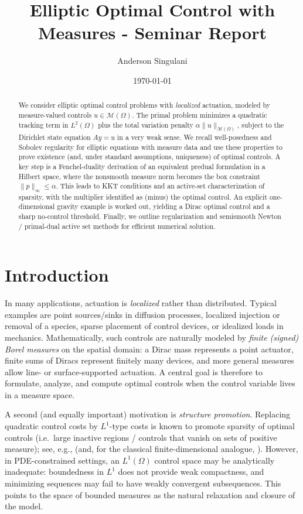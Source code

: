 \documentclass[11pt,a4paper]{article}
\title{Elliptic Optimal Control with Measures - Seminar Report}
\author{Anderson Singulani}
\date{\today}
\begin{document}
\maketitle

\begin{abstract}
We consider elliptic optimal control problems with \emph{localized} actuation, modeled by measure-valued controls \(u\in\mathcal M(\Omega)\).
The primal problem minimizes a quadratic tracking term in \(L^2(\Omega)\) plus the total variation penalty \(\alpha\|u\|_{\mathcal M(\Omega)}\), subject to the Dirichlet state equation \(Ay=u\) in a very weak sense.
We recall well-posedness and Sobolev regularity for elliptic equations with measure data and use these properties to prove existence (and, under standard assumptions, uniqueness) of optimal controls.
A key step is a Fenchel-duality derivation of an equivalent predual formulation in a Hilbert space, where the nonsmooth measure norm becomes the box constraint \(\|p\|_\infty\le \alpha\).
This leads to KKT conditions and an active-set characterization of sparsity, with the multiplier identified as (minus) the optimal control.
An explicit one-dimensional gravity example is worked out, yielding a Dirac optimal control and a sharp no-control threshold.
Finally, we outline regularization and semismooth Newton / primal-dual active set methods for efficient numerical solution.
\end{abstract}



\tableofcontents

\section{Introduction}

In many applications, actuation is \emph{localized} rather than distributed.
Typical examples are point sources/sinks in diffusion processes, localized injection or removal of a species, sparse placement of control devices, or idealized loads in mechanics.
Mathematically, such controls are naturally modeled by \emph{finite (signed) Borel measures} on the spatial domain:
a Dirac mass represents a point actuator, finite sums of Diracs represent finitely many devices, and more general measures allow line- or surface-supported actuation.
A central goal is therefore to formulate, analyze, and compute optimal controls when the control variable lives in a measure space.

A second (and equally important) motivation is \emph{structure promotion}.
Replacing quadratic control costs by $L^1$-type costs is known to promote sparsity of optimal controls (i.e.\ large inactive regions / controls that vanish on sets of positive measure); see, e.g., \cite{Stadler2009L1,WachsmuthWachsmuth2011} (and, for the classical finite-dimensional analogue, \cite{Tibshirani1996}).
However, in PDE-constrained settings, an $L^1(\Omega)$ control space may be analytically inadequate:
boundedness in $L^1$ does not provide weak compactness, and minimizing sequences may fail to have weakly convergent subsequences.
This points to the space of bounded measures as the natural relaxation and closure of the model. 
\end{document}
